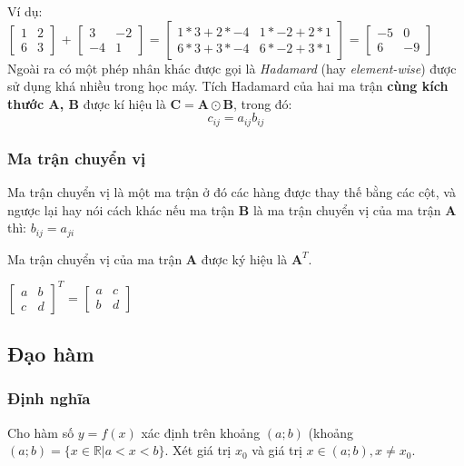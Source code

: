 Ví dụ:\\

$\begin{bmatrix}
   1 & 2 \\6 & 3
\end{bmatrix}$
+ 
$\begin{bmatrix}
3 & -2 \\
-4 & 1
\end{bmatrix}$
=
$\begin{bmatrix}
1 * 3 + 2 * -4 & 1 * -2 + 2 * 1 \\
6 * 3 + 3 * -4  & 6 * -2 + 3 * 1
\end{bmatrix}$
=
$\begin{bmatrix}
-5 & 0\\
6 & -9
\end{bmatrix}$\\

Ngoài ra có một phép nhân khác được gọi là \textit{Hadamard} (hay \textit{element-wise}) được sử dụng khá nhiều trong học máy. Tích Hadamard của hai ma trận \textbf{cùng kích thước A, B} được kí hiệu là $\textbf{C}=\textbf{A} \odot \textbf{B}$, trong đó:
\begin{equation*}
c_{ij}=a_{ij}b_{ij}
\end{equation*}
\subsubsection{Ma trận chuyển vị}
\hspace{5mm} Ma trận chuyển vị là một ma trận ở đó các hàng được thay thế bằng các cột, và ngược lại hay nói cách khác nếu ma trận \textbf{B} là ma trận chuyển vị của ma trận \textbf{A} thì: $b_{ij} = a_{ji}$ \par
Ma trận chuyển vị của ma trận $\textbf{A}$ được ký hiệu là $\textbf{A}^T$.\\ \par

$\begin{bmatrix}
a & b\\ c&d
\end{bmatrix}^T$
=
$\begin{bmatrix}
a&c\\b&d
\end{bmatrix}$
\subsection{Đạo hàm}
\subsubsection{Định nghĩa}
\hspace{5mm} Cho hàm số ${ y=f(x)}$ xác định trên khoảng ${ (a;b)}$ (khoảng ${  (a;b)=\{x\in \mathbb {R} |a<x<b\}}$. Xét giá trị ${  x_{0}}$ và giá trị ${  x\in (a;b),x\neq x_{0}}$. \par 

